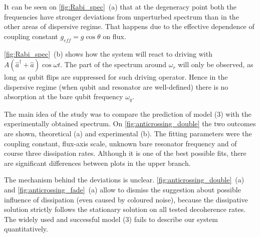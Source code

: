\documentclass[a0, portrait]{a0poster}
\begin{document}
\begin{multicols}{2}
\begin{tcolorbox}[left=1cm, right=1cm, top=0.5cm, bottom=0.5cm, 
                  title={\Large Rabi model}, bottomtitle=.5cm, toptitle=.5cm
                  ]
\begin{minipage}{\textwidth}
\begin{minipage}{\textwidth}
\centering
{}
\label{fig:Rabi_spec}
\end{minipage}

\end{minipage}
It can be seen on \autoref{fig:Rabi_spec}~(a) that at the degeneracy point both the frequencies have stronger deviations from unperturbed spectrum than in the other areas of dispersive regime. That happens due to the effective dependence of coupling constant $g_{eff} = g\cos\theta$ on flux.

\autoref{fig:Rabi_spec}~(b) shows how the system will react to driving with $A (\hat a^\dag + \hat a)\cos\omega t$. The part of the spectrum around $\omega_r$ will only be observed, as long as qubit flips are suppressed for such driving operator. Hence in the dispersive regime (when qubit and resonator are well-defined) there is no absorption at the bare qubit frequency $\omega_q$.

\end{tcolorbox}

\begin{tcolorbox}[left=1cm, right=1cm, top=0.5cm, bottom=0.5cm, 
                  title={\Large Anticrossings}, bottomtitle=.3cm,toptitle=.5cm
                  ]
                  
The main idea of the study was to compare the prediction of model (3) with the experimentally obtained spectrum. On \autoref{fig:anticrossing_double} the two outcomes are shown, theoretical (a) and experimental (b). The fitting parameters were the coupling constant, flux-axis scale, unknown bare resonator frequency and of course three dissipation rates. Although it is one of the best possible fits, there are significant differences between plots in the upper branch.  

The mechanism behind the deviations is unclear. \autoref{fig:anticrossing_double}~(a) and \autoref{fig:anticrossing_fade}~(a) allow to dismiss the suggestion about possible influence of dissipation (even caused by coloured noise), because the dissipative solution strictly follows the stationary solution on all tested decoherence rates. The widely used and successful model (3) fails to describe our system quantitatively.\\


\end{tcolorbox}
\end{multicols}
\end{document}

